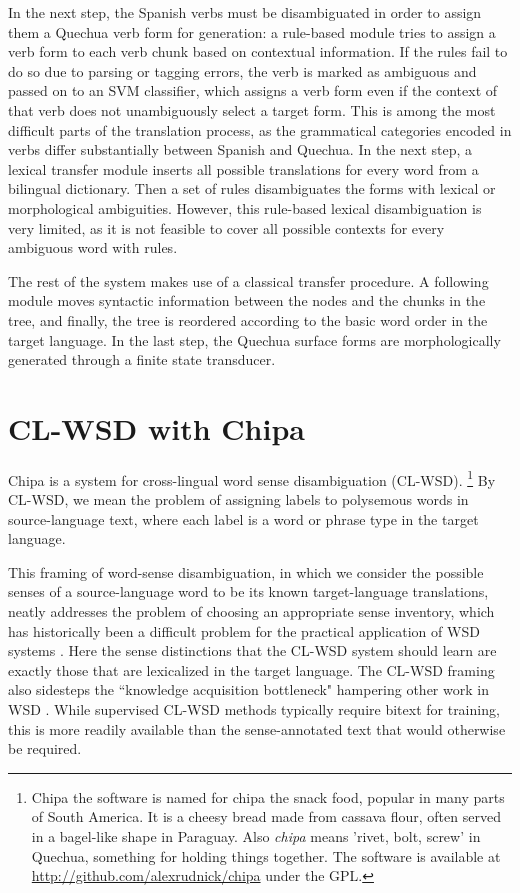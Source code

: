 In the next step, the Spanish verbs must be disambiguated in order to assign
them a Quechua verb form for generation: a rule-based module tries to assign a
verb form to each verb chunk based on contextual information. If the rules fail to
do so due to parsing or tagging errors, the verb is marked as ambiguous and
passed on to an SVM classifier, which assigns a verb form even if the context
of that verb does not unambiguously select a target form. This is among the
most difficult parts of the
translation process, as the grammatical categories encoded in verbs differ
substantially between Spanish and Quechua. In the next step, a lexical transfer
module inserts all possible translations for every word from a bilingual dictionary.
Then a set of rules disambiguates the forms with lexical or morphological
ambiguities. However, this rule-based lexical disambiguation is very limited,
as it is not feasible to cover all possible contexts for every ambiguous word
with rules.

The rest of the system makes use of a classical transfer procedure. A following module
moves syntactic information between the nodes and the chunks in the tree, and
finally, the tree is reordered according to the basic word order in the target
language. In the last step, the Quechua surface forms are morphologically
generated through a finite state transducer.

\section{CL-WSD with Chipa}
Chipa is a system for cross-lingual word sense disambiguation (CL-WSD).
\footnote{Chipa the software is named for chipa the snack food, popular in many
  parts of South America. It is a cheesy bread made from cassava flour, often
  served in a bagel-like shape in Paraguay.  Also \emph{chipa} means 'rivet,
  bolt, screw' in Quechua, something for holding things together.  The software
is available at \\ \url{http://github.com/alexrudnick/chipa} under the GPL.} By
CL-WSD, we mean the problem of assigning labels to polysemous words in
source-language text, where each label is a word or phrase type in the target
language.

This framing of word-sense disambiguation, in which we consider the possible
senses of a source-language word to be its known target-language translations,
neatly addresses the problem of choosing an appropriate sense inventory, which
has historically been a difficult problem for the practical application of WSD
systems \cite{agirre2006word}.
Here the sense distinctions that the CL-WSD system should learn are exactly
those that are lexicalized in the target language.
The CL-WSD framing also sidesteps the ``knowledge acquisition bottleneck"
hampering other work in WSD \cite{lefever-hoste-decock:2011:ACL-HLT2011}.
While supervised CL-WSD methods typically require bitext for training, this is
more readily available than the sense-annotated text that would otherwise be
required.


